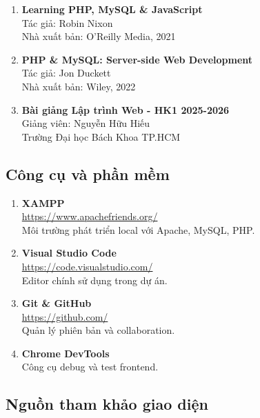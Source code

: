 \begin{enumerate}
    \item \textbf{Learning PHP, MySQL \& JavaScript}\\
    Tác giả: Robin Nixon\\
    Nhà xuất bản: O'Reilly Media, 2021
    
    \item \textbf{PHP \& MySQL: Server-side Web Development}\\
    Tác giả: Jon Duckett\\
    Nhà xuất bản: Wiley, 2022
    
    \item \textbf{Bài giảng Lập trình Web - HK1 2025-2026}\\
    Giảng viên: Nguyễn Hữu Hiếu\\
    Trường Đại học Bách Khoa TP.HCM
\end{enumerate}

\subsection{Công cụ và phần mềm}

\begin{enumerate}
    \item \textbf{XAMPP}\\
    \url{https://www.apachefriends.org/}\\
    Môi trường phát triển local với Apache, MySQL, PHP.
    
    \item \textbf{Visual Studio Code}\\
    \url{https://code.visualstudio.com/}\\
    Editor chính sử dụng trong dự án.
    
    \item \textbf{Git \& GitHub}\\
    \url{https://github.com/}\\
    Quản lý phiên bản và collaboration.
    
    \item \textbf{Chrome DevTools}\\
    Công cụ debug và test frontend.
\end{enumerate}

\subsection{Nguồn tham khảo giao diện}

